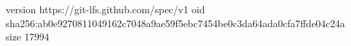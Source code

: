 version https://git-lfs.github.com/spec/v1
oid sha256:ab0e9270811049162c7048a9ae59f5ebc7454be0c3da64ada0cfa7ffde04c24a
size 17994
